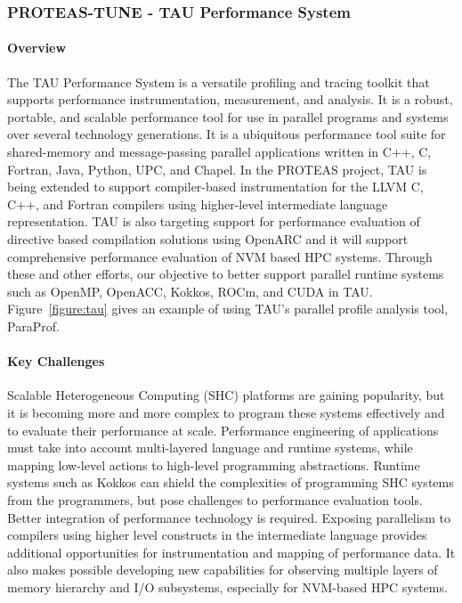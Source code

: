 \subsubsection{ PROTEAS-TUNE - TAU Performance System}\label{subsubsect:tau}

\paragraph{Overview} 
The TAU Performance System is a versatile profiling and tracing toolkit that supports performance instrumentation, measurement, and analysis. It is a robust, portable, and scalable performance tool for use in parallel programs and systems over several technology generations. It is a ubiquitous performance tool suite for shared-memory and message-passing parallel applications written in C++, C, Fortran, Java, Python, UPC, and Chapel. In the PROTEAS project, TAU is being extended to support compiler-based instrumentation for the LLVM C, C++, and Fortran compilers using higher-level intermediate language representation. TAU is also targeting support for performance evaluation of directive based compilation solutions using OpenARC and it will support comprehensive performance evaluation of NVM based HPC systems.  Through these and other efforts, our objective to better support parallel runtime systems such as OpenMP, OpenACC, Kokkos, ROCm, and CUDA in TAU. Figure~\ref{figure:tau} gives an example of using TAU's parallel profile analysis tool, ParaProf.

\paragraph{Key Challenges} 
Scalable Heterogeneous Computing (SHC) platforms are gaining popularity, but it is becoming more and more complex to program these systems effectively and to evaluate their performance at scale. Performance engineering of applications must take into account multi-layered language and runtime systems, while mapping low-level actions to high-level programming abstractions.  Runtime systems such as Kokkos can shield the complexities of programming SHC systems from the programmers, but pose challenges to performance evaluation tools.  Better integration of performance technology is required.  Exposing parallelism to compilers using higher level constructs in the intermediate language provides additional opportunities for instrumentation and mapping of performance data.  It also makes possible developing new capabilities for observing multiple layers of memory hierarchy and I/O subsystems, especially for NVM-based HPC systems. 

